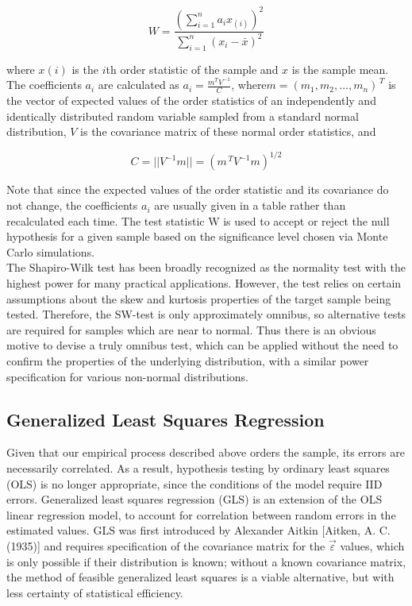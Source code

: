 \documentclass[12pt]{article}
\begin{document}
\begin{equation}
W=\frac{( \sum_{i=1}^{n}a_{i}x_{(i)})^{2}}{\sum_{i=1}^{n}(x_{i}-\bar{x})^{2}}\label{eq1}
\end{equation}

where $x(i)$ is the $i$th order statistic of the sample and $x$ is the sample mean. The coefficients $a_i$ are calculated as $a_i=\frac{m^{T}V^{-1}}{C}$, where$ m=(m_1,m_2, ... ,m_n)^{\, T}$ is the vector of expected values of the order statistics of an independently and identically distributed random variable sampled from a standard normal distribution, $V$ is the covariance matrix of these normal order statistics, and

\begin{equation}
C=||V^{-1}m|| = (m^{\, T}V^{-1}m)^{1/2}\label{eq2}
\end{equation}

Note that since the expected values of the order statistic and its covariance do not change, the coefficients $a_i$ are usually given in a table rather than recalculated each time. The test statistic W is used to accept or reject the null hypothesis for a given sample based on the significance level  chosen via Monte Carlo simulations.\\

The Shapiro-Wilk test has been broadly recognized as the normality test with the highest power for many practical applications. However, the test relies on certain assumptions about the skew and kurtosis properties of the target sample being tested. Therefore, the SW-test is only approximately omnibus, so alternative tests are required for samples which are near to normal. Thus there is an obvious motive to devise a truly omnibus test, which can be applied without the need to confirm the properties of the underlying distribution, with a similar power specification for various non-normal distributions.

\subsection{Generalized Least Squares Regression}\label{subsec2}

Given that our empirical process described above orders the sample, its errors are necessarily correlated. As a result, hypothesis testing by ordinary least squares (OLS) is no longer appropriate, since the conditions of the model require IID errors. Generalized least squares regression (GLS) is an extension of the OLS linear regression model, to account for correlation between random errors  in the estimated values. GLS was first introduced by Alexander Aitkin [Aitken, A. C. (1935)] and requires specification of the covariance matrix for the $\vec{\varepsilon}$ values, which is only possible if their distribution is known; without a known covariance matrix, the method of feasible generalized least squares is a viable alternative, but with less certainty of statistical efficiency.\\
\end{document}
